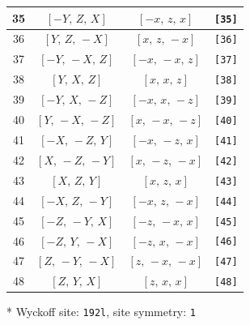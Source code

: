 \documentclass[fleqn,8pt]{jsarticle}
\begin{document}
\begin{longtable}{cccc}
35 & $\left[ - Y,\, Z,\, X \right]$ & $\left[ - x,\, z,\, x \right]$ & {\tt [35]} \\ \hline
36 & $\left[ Y,\, Z,\, - X \right]$ & $\left[ x,\, z,\, - x \right]$ & {\tt [36]} \\ \hline
37 & $\left[ - Y,\, - X,\, Z \right]$ & $\left[ - x,\, - x,\, z \right]$ & {\tt [37]} \\ \hline
38 & $\left[ Y,\, X,\, Z \right]$ & $\left[ x,\, x,\, z \right]$ & {\tt [38]} \\ \hline
39 & $\left[ - Y,\, X,\, - Z \right]$ & $\left[ - x,\, x,\, - z \right]$ & {\tt [39]} \\ \hline
40 & $\left[ Y,\, - X,\, - Z \right]$ & $\left[ x,\, - x,\, - z \right]$ & {\tt [40]} \\ \hline
41 & $\left[ - X,\, - Z,\, Y \right]$ & $\left[ - x,\, - z,\, x \right]$ & {\tt [41]} \\ \hline
42 & $\left[ X,\, - Z,\, - Y \right]$ & $\left[ x,\, - z,\, - x \right]$ & {\tt [42]} \\ \hline
43 & $\left[ X,\, Z,\, Y \right]$ & $\left[ x,\, z,\, x \right]$ & {\tt [43]} \\ \hline
44 & $\left[ - X,\, Z,\, - Y \right]$ & $\left[ - x,\, z,\, - x \right]$ & {\tt [44]} \\ \hline
45 & $\left[ - Z,\, - Y,\, X \right]$ & $\left[ - z,\, - x,\, x \right]$ & {\tt [45]} \\ \hline
46 & $\left[ - Z,\, Y,\, - X \right]$ & $\left[ - z,\, x,\, - x \right]$ & {\tt [46]} \\ \hline
47 & $\left[ Z,\, - Y,\, - X \right]$ & $\left[ z,\, - x,\, - x \right]$ & {\tt [47]} \\ \hline
48 & $\left[ Z,\, Y,\, X \right]$ & $\left[ z,\, x,\, x \right]$ & {\tt [48]} \\
\end{longtable}
* Wyckoff site: {\tt 192l}, site symmetry: {\tt 1}
\renewcommand{\arraystretch}{1.2}
\end{document}
